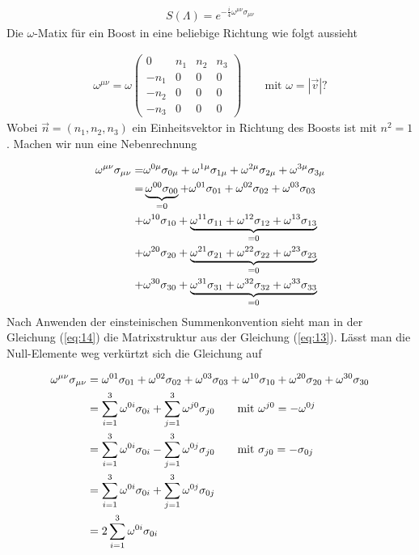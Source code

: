 \begin{align}
  \label{eq:12}
  S(\Lambda) = e^{-\frac{i}{4}\omega^{\mu\nu}\sigma_{\mu\nu}}
\end{align}
Die \(\omega\)-Matix für ein Boost in eine beliebige Richtung wie folgt aussieht

\begin{align}
  \label{eq:13}
  \omega^{\mu\nu} = \omega
  \begin{pmatrix}
    0&n_1&n_2&n_3\\
    -n_1&0&0&0\\ 
    -n_2&0&0&0\\
    -n_3&0&0&0
  \end{pmatrix} \qquad \text{mit }\omega=|\vec v| ?
\end{align}
Wobei \(\vec n = (n_1,n_2,n_3)\) ein Einheitsvektor in Richtung des Boosts ist mit \(n^2=1\). Machen wir nun eine Nebenrechnung

\begin{align}
  \label{eq:14}
  \omega^{\mu\nu}\sigma_{\mu\nu} =& \omega^{0\mu}\sigma_{0\mu} + \omega^{1\mu}\sigma_{1\mu}+\omega^{2\mu}\sigma_{2\mu}+\omega^{3\mu}\sigma_{3\mu}\notag \\
=&\underbr{\omega^{00}\sigma_{00}}_{=0} +  \omega^{01}\sigma_{01} +  \omega^{02}\sigma_{02} +  \omega^{03}\sigma_{03} \notag\\
+& \omega^{10}\sigma_{10}+\underbr{ \omega^{11}\sigma_{11}+ \omega^{12}\sigma_{12}+ \omega^{13}\sigma_{13}}_{=0}\notag\\
+&\omega^{20}\sigma_{20}+\underbr{\omega^{21}\sigma_{21}+\omega^{22}\sigma_{22}+\omega^{23}\sigma_{23}}_{=0}\notag\\
+&\omega^{30}\sigma_{30}+\underbr{\omega^{31}\sigma_{31}+\omega^{32}\sigma_{32}+\omega^{33}\sigma_{33}}_{=0}
\end{align}
Nach Anwenden der einsteinischen Summenkonvention sieht man in der Gleichung (\ref{eq:14}) die Matrixstruktur aus der Gleichung (\ref{eq:13}). Lässt man die Null-Elemente weg verkürtzt sich die Gleichung auf

\begin{align}
  \label{eq:15}
  \omega^{\mu\nu}\sigma_{\mu\nu} &= \omega^{01}\sigma_{01} +  \omega^{02}\sigma_{02} +  \omega^{03}\sigma_{03}+\omega^{10}\sigma_{10}+\omega^{20}\sigma_{20}+\omega^{30}\sigma_{30} \notag\\
&= \sum_{i=1}^3 \omega^{0i}\sigma_{0i} + \sum_{j=1}^3 \omega^{j0}\sigma_{j0} \qquad \text{mit }\omega^{j0}=-\omega^{0j} \notag\\
&= \sum_{i=1}^3 \omega^{0i}\sigma_{0i} - \sum_{j=1}^3 \omega^{0j}\sigma_{j0} \qquad \text{mit }\sigma_{j0}=-\sigma_{0j} \notag\\
&= \sum_{i=1}^3 \omega^{0i}\sigma_{0i} + \sum_{j=1}^3 \omega^{0j}\sigma_{0j} \notag\\
&= 2\sum_{i=1}^3 \omega^{0i}\sigma_{0i}
\end{align}

